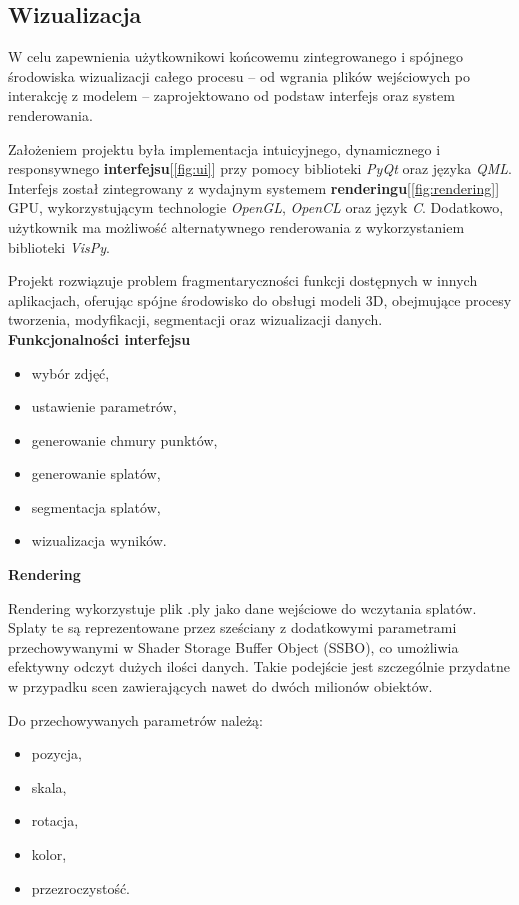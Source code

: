 \subsection{Wizualizacja}
W celu zapewnienia użytkownikowi końcowemu zintegrowanego i spójnego środowiska wizualizacji całego procesu – od wgrania plików wejściowych po interakcję z modelem – zaprojektowano od podstaw interfejs oraz system renderowania.

Założeniem projektu była implementacja intuicyjnego, dynamicznego i responsywnego \textbf{interfejsu}[\ref{fig:ui}] przy pomocy biblioteki \textit{PyQt} oraz języka \textit{QML}. Interfejs został zintegrowany z wydajnym systemem \textbf{renderingu}[\ref{fig:rendering}] GPU, wykorzystującym technologie \textit{OpenGL}, \textit{OpenCL} oraz język \textit{C}. Dodatkowo, użytkownik ma możliwość alternatywnego renderowania z wykorzystaniem biblioteki \textit{VisPy}.

Projekt rozwiązuje problem fragmentaryczności funkcji dostępnych w innych aplikacjach, oferując spójne środowisko do obsługi modeli 3D, obejmujące procesy tworzenia, modyfikacji, segmentacji oraz wizualizacji danych.
\\[10pt]
\textbf{Funkcjonalności interfejsu}

\begin{itemize} \item wybór zdjęć, \item ustawienie parametrów, \item generowanie chmury punktów, \item generowanie splatów, \item segmentacja splatów, \item wizualizacja wyników. \end{itemize}

\vspace{10pt}
{\setlength{\parindent}{0pt}
\textbf{Rendering}
}

Rendering wykorzystuje plik .ply jako dane wejściowe do wczytania splatów. Splaty te są reprezentowane przez sześciany z dodatkowymi parametrami przechowywanymi w Shader Storage Buffer Object (SSBO), co umożliwia efektywny odczyt dużych ilości danych. Takie podejście jest szczególnie przydatne w przypadku scen zawierających nawet do dwóch milionów obiektów.

Do przechowywanych parametrów należą: \begin{itemize} \item pozycja, \item skala, \item rotacja, \item kolor, \item przezroczystość. \end{itemize}

